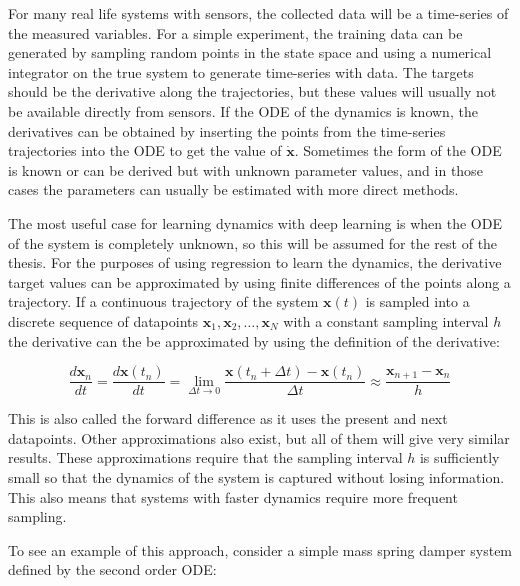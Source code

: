 \documentclass[12pt,a4paper]{book}
\begin{document}
For many real life systems with sensors, the collected data will be a time-series of the measured variables. For a simple experiment, the training data can be generated by sampling random points in the state space and using a numerical integrator on the true system to generate time-series with data. The targets should be the derivative along the trajectories, but these values will usually not be available directly from sensors. If the ODE of the dynamics is known, the derivatives can be obtained by inserting the points from the time-series trajectories into the ODE to get the value of $\dot{\bm{x}}$. Sometimes the form of the ODE is known or can be derived but with unknown parameter values, and in those cases the parameters can usually be estimated with more direct methods.

The most useful case for learning dynamics with deep learning is when the ODE of the system is completely unknown, so this will be assumed for the rest of the thesis. For the purposes of using regression to learn the dynamics, the derivative target values can be approximated by using finite differences of the points along a trajectory. If a continuous trajectory of the system $\bm{x}(t)$ is sampled into a discrete sequence of datapoints $\bm{x}_1, \bm{x}_2, \dots, \bm{x}_N$ with a constant sampling interval $h$ the derivative can the be approximated by using the definition of the derivative:

\begin{equation}
    \frac{d \bm{x}_n}{d t} = \frac{d \bm{x}(t_n)}{d t} = \lim_{\Delta t \rightarrow 0} \frac{\bm{x}(t_n + \Delta t) - \bm{x}(t_n)}{\Delta t}
    \approx \frac{\bm{x}_{n + 1} - \bm{x}_n}{h}
\end{equation}

This is also called the forward difference as it uses the present and next datapoints. Other approximations also exist, but all of them will give very similar results. These approximations require that the sampling interval $h$ is sufficiently small so that the dynamics of the system is captured without losing information. This also means that systems with faster dynamics require more frequent sampling.

To see an example of this approach, consider a simple mass spring damper system defined by the second order ODE:
\end{document}
